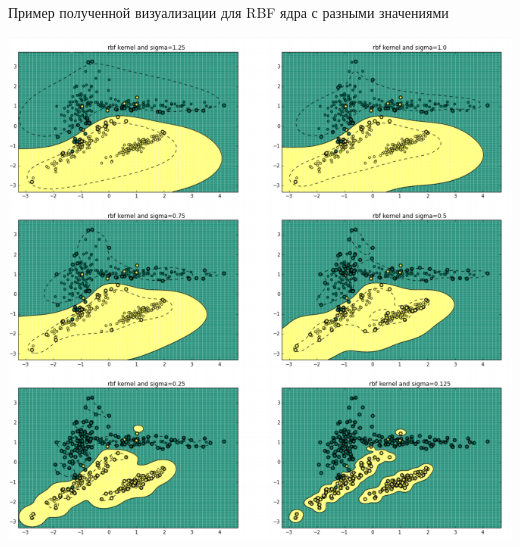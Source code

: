 \documentclass[a4paper,12pt]{article}
\begin{document}
Пример полученной визуализации для RBF ядра с разными значениями \sigma

\includegraphics[width=\textwidth, keepaspectratio]{images/visualization}
\end{document}
